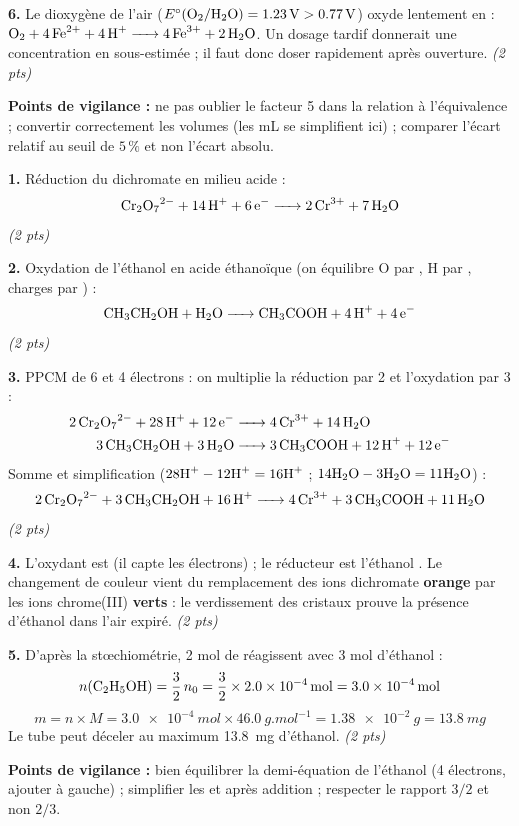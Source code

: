 \documentclass[11pt]{article}
\begin{document}
\begin{corrige}
\textbf{6.} Le dioxygène de l'air ($E^\circ(\ce{O2}/\ce{H2O}) = \SI{1,23}{V} > \SI{0,77}{V}$) oxyde lentement  en  : $\ce{O2 + 4Fe^2+ + 4H+ -> 4Fe^3+ + 2H2O}$. Un dosage tardif donnerait une concentration en  sous-estimée ; il faut donc doser rapidement après ouverture. \hfill \emph{(2 pts)}

\textbf{Points de vigilance :} ne pas oublier le facteur 5 dans la relation à l'équivalence ; convertir correctement les volumes (les mL se simplifient ici) ; comparer l'écart relatif au seuil de $5\,\%$ et non l'écart absolu.
\end{corrige}

\begin{corrige}
\textbf{1.} Réduction du dichromate en milieu acide :
\[ \ce{Cr2O7^2- + 14H+ + 6e- -> 2Cr^3+ + 7H2O} \]
\hfill \emph{(2 pts)}

\textbf{2.} Oxydation de l'éthanol en acide éthanoïque (on équilibre O par , H par , charges par ) :
\[ \ce{CH3CH2OH + H2O -> CH3COOH + 4H+ + 4e-} \]
\hfill \emph{(2 pts)}

\textbf{3.} PPCM de 6 et 4 électrons : on multiplie la réduction par 2 et l'oxydation par 3 :
\begin{align*}
\ce{2Cr2O7^2- + 28H+ + 12e- &-> 4Cr^3+ + 14H2O} \\
\ce{3CH3CH2OH + 3H2O &-> 3CH3COOH + 12H+ + 12e-}
\end{align*}
Somme et simplification ($28\ce{H+} - 12\ce{H+} = 16\ce{H+}$ ; $14\ce{H2O} - 3\ce{H2O} = 11\ce{H2O}$) :
\[ \ce{2Cr2O7^2- + 3CH3CH2OH + 16H+ -> 4Cr^3+ + 3CH3COOH + 11H2O} \]
\hfill \emph{(2 pts)}

\textbf{4.} L'oxydant est  (il capte les électrons) ; le réducteur est l'éthanol . Le changement de couleur vient du remplacement des ions dichromate \textbf{orange} par les ions chrome(III)  \textbf{verts} : le verdissement des cristaux prouve la présence d'éthanol dans l'air expiré. \hfill \emph{(2 pts)}

\textbf{5.} D'après la stœchiométrie, 2 mol de  réagissent avec 3 mol d'éthanol :
\[ n(\ce{C2H5OH}) = \frac{3}{2}\, n_0 = \frac{3}{2} \times \SI{2,0e-4}{mol} = \SI{3,0e-4}{mol} \]
\[ m = n \times M = \SI{3,0e-4}{mol} \times \SI{46,0}{g.mol^{-1}} = \SI{1,38e-2}{g} = \SI{13,8}{mg} \]
Le tube peut déceler au maximum \SI{13,8}{mg} d'éthanol. \hfill \emph{(2 pts)}

\textbf{Points de vigilance :} bien équilibrer la demi-équation de l'éthanol (4 électrons, ajouter  à gauche) ; simplifier les  et  après addition ; respecter le rapport $3/2$ et non $2/3$.
\end{corrige}
\end{document}
